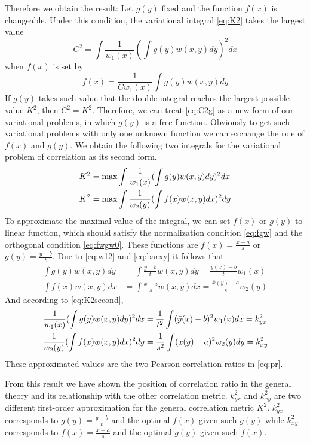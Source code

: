 \documentclass{article}
\begin{document}
Therefore we obtain the result: Let $g(y)$ fixed and 
the function $f(x)$ is changeable. Under this condition, the variational integral
\eqref{eq:K2} takes the largest value
\begin{equation}\label{eq:C2g}
    C^2 = \int \frac{1}{w_1(x)} (\int g(y) w(x,y)dy)^2 dx
\end{equation}
when $f(x)$ is set by
\begin{equation}\label{eq:fbyg}
    f(x) = \frac{1}{C w_1(x)}
    \int g(y) w(x,y) dy
\end{equation}
If $g(y)$ takes such value that the double integral reaches
the largest possible value $K^2$, then $C^2=K^2$. Therefore,
we can treat \eqref{eq:C2g} as a new form of our variational
problems, in which $g(y)$ is a free function.
Obviously to get such variational problems with only
one unknown function we can exchange the role of $f(x)$
and $g(y)$. We obtain the following two integrals for
the variational problem of correlation as its second form.
\begin{align}
    K^2 & = \max \int  \frac{1}{w_1(x)} (\int g(y) w(x,y)dy)^2 dx \notag \\
    K^2 & = \max \int \frac{1}{w_2(y)} (\int f(x) w(x,y)dx)^2 dy \label{eq:K2second}
\end{align}
To approximate the maximal value of the integral, we can
set $f(x)$ or $g(y)$ to linear function, which should
satisfy the normalization condition \ref{eq:fgw}
and the orthogonal condition \ref{eq:fwgw0}. These functions
are $f(x)=\frac{x-a}{s}$
or $g(y) = \frac{y-b}{t}$.
Due to \ref{eq:w12} and \ref{eq:barxy} it follows that
\begin{align*}
    \int g(y) w(x,y) dy
    & = \int \frac{y-b}{t} w(x,y) dy =
    \frac{\bar{y}(x) - b}{t} w_1(x) \\
    \int f(x) w(x,y) dx
    & = \int \frac{x-a}{s} w(x,y) dx =
    \frac{\bar{x}(y) - a}{s} w_2(y)
\end{align*}
And according to \ref{eq:K2second},
\begin{align*}
    \frac{1}{w_1(x)} (\int g(y) w(x,y)dy)^2 dx 
    & = \frac{1}{t^2}\int (\bar{y}(x) - b)^2 w_1(x)dx =
    k^2_{yx}\notag \\
     \frac{1}{w_2(y)} (\int f(x) w(x,y)dx)^2 dy&= \frac{1}{s^2}\int (\bar{x}(y) - a)^2 w_2(y)dy = k^2_{xy}
\end{align*}
These approximated values are the two Pearson correlation
ratios in \eqref{eq:pr}.

From this result we have shown 
the position of correlation ratio in the general theory
and its relationship with the other correlation metric.
$k^2_{yx}$ and $k^2_{xy}$
are two different first-order approximation for the general
correlation metric $K^2$.
$k^2_{yx}$ corresponds to $g(y)=\frac{y-b}{t}$
and the optimal $f(x)$ given such $g(y)$ while
$k^2_{xy}$ corresponds to $f(x)=\frac{x-a}{s}$
and the optimal $g(y)$ given such $f(x)$.
\end{document}
